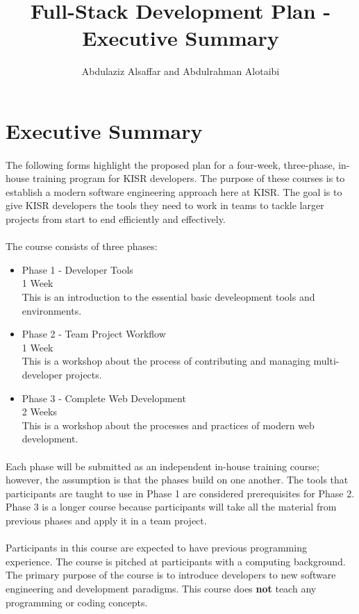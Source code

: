 \documentclass[a4paper,11pt]{article}
\author{Abdulaziz Alsa{f}far and Abdulrahman Alotaibi}
\title{Full-Stack Development Plan - Executive Summary}
\begin{document}
\maketitle
\pagestyle{plain}
\setcounter{page}{1}

\section{Executive Summary}

\paragraph{}
The following forms highlight the proposed plan for a four-week, three-phase, in-house training program for KISR developers. The purpose of these courses is to establish a modern software engineering approach here at KISR. The goal is to give KISR developers the tools they need to work in teams to tackle larger projects from start to end efficiently and effectively.

\paragraph{}
The course consists of three phases:
\begin{itemize}
	\item Phase 1 - Developer Tools\\1 Week\\This is an introduction to the essential basic develeopment tools and environments.
	\item Phase 2 - Team Project Workflow\\1 Week\\This is a workshop about the process of contributing and managing multi-developer projects.
	\item Phase 3 - Complete Web Development\\2 Weeks\\This is a workshop about the processes and practices of modern web development.
\end{itemize}

\paragraph{}
Each phase will be submitted as an independent in-house training course; however, the assumption is that the phases build on one another. The tools that participants are taught to use in Phase 1 are considered prerequisites for Phase 2. Phase 3 is a longer course because participants will take all the material from previous phases and apply it in a team project.

\paragraph{}
Participants in this course are expected to have previous programming experience. The course is pitched at participants with a computing background. The primary purpose of the course is to introduce developers to new software engineering and development paradigms. This course does \textbf{not} teach any programming or coding concepts.
\end{document}
